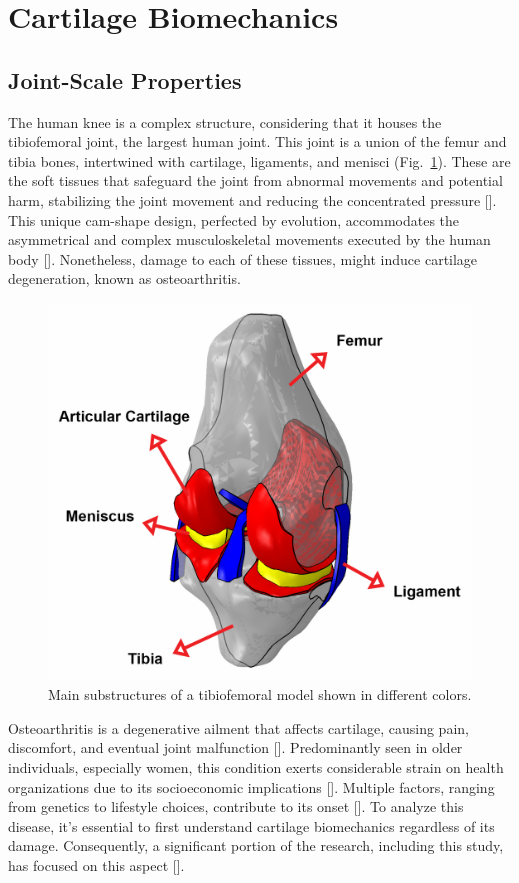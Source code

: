 \documentclass[12pt,a4paper]{report}
\begin{document}
\section{Cartilage Biomechanics}
\subsection{Joint-Scale Properties}
The human knee is a complex structure, considering that it houses the tibiofemoral joint, the largest human joint. This joint is a union of the femur and tibia bones, intertwined with cartilage, ligaments, and menisci (Fig.~\ref{knee}).
These are the soft tissues that safeguard the joint from abnormal movements and potential harm, stabilizing the joint movement and reducing the concentrated pressure [\cite{walker1975,mameri2022}]. This unique cam-shape design, perfected by evolution, accommodates the asymmetrical and complex musculoskeletal movements executed by the human body [\cite{dye1987,goldblatt2003}]. Nonetheless, damage to each of these tissues, might induce cartilage degeneration, known as osteoarthritis.
%
\begin{figure}
\centering
\includegraphics[width=0.7\linewidth]{knee.jpg}
\caption{Main substructures of a tibiofemoral model shown in different colors.
\label{knee}}
\end{figure}

Osteoarthritis is a degenerative ailment that affects cartilage, causing pain, discomfort, and eventual joint malfunction [\cite{lespasio2017}]. Predominantly seen in older individuals, especially women, this condition exerts considerable strain on health organizations due to its socioeconomic implications [\cite{Chen2012,gillian2019}]. Multiple factors, ranging from genetics to lifestyle choices, contribute to its onset [\cite{loeser2016,mobasheri2017,astephen2021}]. To analyze this disease, it's essential to first understand cartilage biomechanics regardless of its damage. Consequently, a significant portion of the research, including this study, has focused on this aspect [\cite{kong2022}].
\end{document}
